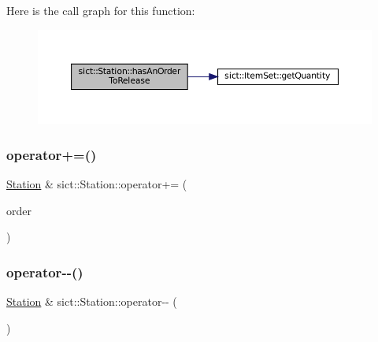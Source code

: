 Here is the call graph for this function\+:
\nopagebreak
\begin{figure}[H]
\begin{center}
\leavevmode
\includegraphics[width=350pt]{classsict_1_1Station_a9e892b3c93dd2163d1c6569dba6c8536_cgraph}
\end{center}
\end{figure}
\mbox{\label{classsict_1_1Station_acd6e5d1500de14a981885e060b31d5ca}} 
\subsubsection{\texorpdfstring{operator+=()}{operator+=()}}
{\footnotesize\ttfamily \mbox{\hyperlink{classsict_1_1Station}{Station}} \& sict\+::\+Station\+::operator+= (\begin{DoxyParamCaption}\item[{\mbox{\hyperlink{classsict_1_1CustomerOrder}{Customer\+Order}} \&\&}]{order }\end{DoxyParamCaption})}

\mbox{\label{classsict_1_1Station_ab5c0ac9d9ccdd92469542a49e3c01e05}} 
\subsubsection{\texorpdfstring{operator-\/-\/()}{operator--()}}
{\footnotesize\ttfamily \mbox{\hyperlink{classsict_1_1Station}{Station}} \& sict\+::\+Station\+::operator-\/-\/ (\begin{DoxyParamCaption}{ }\end{DoxyParamCaption})}

\mbox{\label{classsict_1_1Station_a583745c920a8fd95aaaf84ef2d96a993}} 
